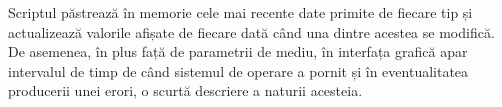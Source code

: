 Scriptul păstrează în memorie cele mai recente date primite de fiecare tip și actualizează valorile afișate de fiecare dată când una dintre acestea se modifică. De asemenea, în plus față de parametrii de mediu, în interfața grafică apar intervalul de timp de când sistemul de operare a pornit și în eventualitatea producerii unei erori, o scurtă descriere a naturii acesteia.
